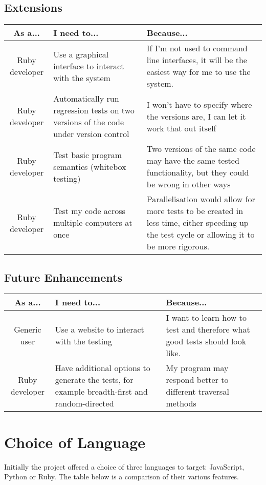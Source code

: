   \subsection{Extensions}
    \begin{tabular}{| c | p{\colwidth} | p{\colwidth} |}
    \hline
    \textbf{As a...} & \textbf{I need to...} & \textbf{Because...} \\
    \hline
    Ruby developer &
    Use a graphical interface to interact with the system &
    If I'm not used to command line interfaces, it will be the easiest way for me to use the system. \\
    \hline
    Ruby developer &
    Automatically run regression tests on two versions of the code under version control &
    I won't have to specify where the versions are, I can let it work that out itself \\
    \hline
    Ruby developer &
    Test basic program semantics (whitebox testing) &
    Two versions of the same code may have the same tested functionality, but they could be wrong in other ways \\
    \hline
    Ruby developer &
    Test my code across multiple computers at once &
    Parallelisation would allow for more tests to be created in less time, either speeding up the test cycle or allowing it to be more rigorous. \\
    \hline
    \end{tabular}
  \subsection{Future Enhancements}
    \begin{tabular}{| c | p{\colwidth} | p{\colwidth} |}
    \hline
    \textbf{As a...} & \textbf{I need to...} & \textbf{Because...} \\
    \hline
    Generic user &
    Use a website to interact with the testing &
    I want to learn how to test and therefore what good tests should look like. \\
    \hline
    Ruby developer &
    Have additional options to generate the tests, for example breadth-first and random-directed &
    My program may respond better to different traversal methods \\
    \hline
    \end{tabular}

\section{Choice of Language}
  Initially the project offered a choice of three languages to target: JavaScript, Python or Ruby. The table below is a comparison of their various features.

